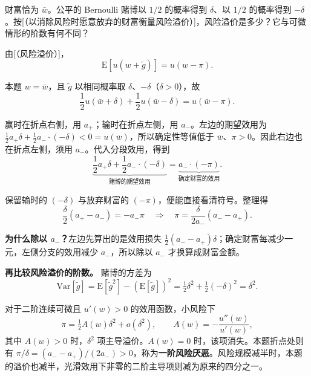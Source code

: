 \begin{tcolorbox}[example,title=课堂例题：折点处的公平赌博]
\begin{question}
 财富恰为 $\bar{w}$。公平的 Bernoulli 赌博以 $1/2$ 的概率得到 $\delta$、以 $1/2$ 的概率得到 $-\delta$。按[（以消除风险时愿意放弃的财富衡量风险溢价）]，风险溢价是多少？它与可微情形的阶数有何不同？
\end{question}
\begin{solution}[blank-type=manual,blank-vsep=5\baselineskip]
由[（风险溢价）]，
\[
 \mathrm E[u(w+\tilde g)]=u(w-\pi).
\]

本题 $w=\bar w$，且 $\tilde g$ 以相同概率取 $\delta$、$-\delta$（$\delta>0$），故
\[
 \frac12u(\bar w+\delta)+\frac12u(\bar w-\delta)
 =u(\bar w-\pi).
\]

赢时在折点右侧，用 $a_+$；输时在折点左侧，用 $a_-$。左边的期望效用为
$\tfrac12a_+\delta+\tfrac12a_-\cdot(-\delta)<0=u(\bar w)$，所以确定性等值低于 $\bar w$、$\pi>0$。因此右边也在折点左侧，须用 $a_-$。代入分段效用，得到
\[
 \underbrace{\frac12a_+\delta+\frac12a_-\cdot(-\delta)}_{\text{赌博的期望效用}}
 =\underbrace{a_-\cdot(-\pi)}_{\text{确定财富的效用}}.
\]

保留输时的 $(-\delta)$ 与放弃财富的 $(-\pi)$，便能直接看清符号。整理得
\[
 \frac\delta2(a_+-a_-)=-a_-\pi
 \quad\Longrightarrow\quad
 \boxed{\pi=\frac{\delta}{2a_-}(a_--a_+).}
\]

\textbf{为什么除以 $a_-$？}左边先算出的是效用损失
$\tfrac12(a_--a_+)\delta$；确定财富每减少一元，左侧分支的效用减少 $a_-$，所以除以 $a_-$ 才换算成财富金额。

\textbf{再比较风险溢价的阶数。}
赌博的方差为
\[
    \mathrm{Var}[\tilde{g}]
    =\mathrm{E}[\tilde{g}^{2}]-(\mathrm{E}[\tilde{g}])^{2}
    =\tfrac12\delta^{2}+\tfrac12(-\delta)^{2}
    =\delta^{2}.
\]

对于二阶连续可微且 $u'(w)>0$ 的效用函数，小风险下
\[
    \pi=\tfrac12 A(w)\delta^{2}+o(\delta^2),
    \qquad A(w)=-\frac{u''(w)}{u'(w)},
\]
其中 $A(w)>0$ 时，$\delta^2$ 项主导溢价。$A(w)=0$ 时，该项消失。本题折点处则有 $\pi/\delta=(a_--a_+)/(2a_-)>0$，称为\textbf{一阶风险厌恶}。风险规模减半时，本题的溢价也减半，光滑效用下非零的二阶主导项则减为原来的四分之一。

\end{solution}
\end{tcolorbox}


